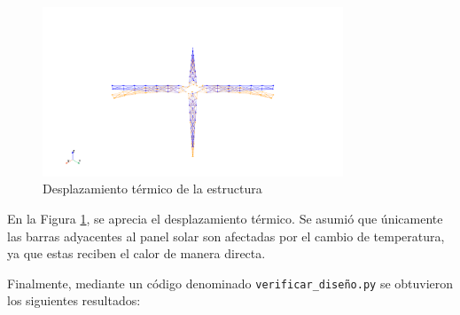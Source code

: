 \begin{figure}[H]
    \centering
    \includegraphics[width=0.8\textwidth]{GRAFICOS_DISENO_LUKAS/desplazamiento_termico.png}
    \caption{Desplazamiento térmico de la estructura}
    \label{fig:propuesta1_termico}
\end{figure}

En la Figura \ref{fig:propuesta1_termico}, se aprecia el desplazamiento térmico. Se asumió que únicamente las barras adyacentes al panel solar son afectadas por el cambio de temperatura, ya que estas reciben el calor de manera directa.

Finalmente, mediante un código denominado \texttt{verificar\_diseño.py} se obtuvieron los siguientes resultados:


